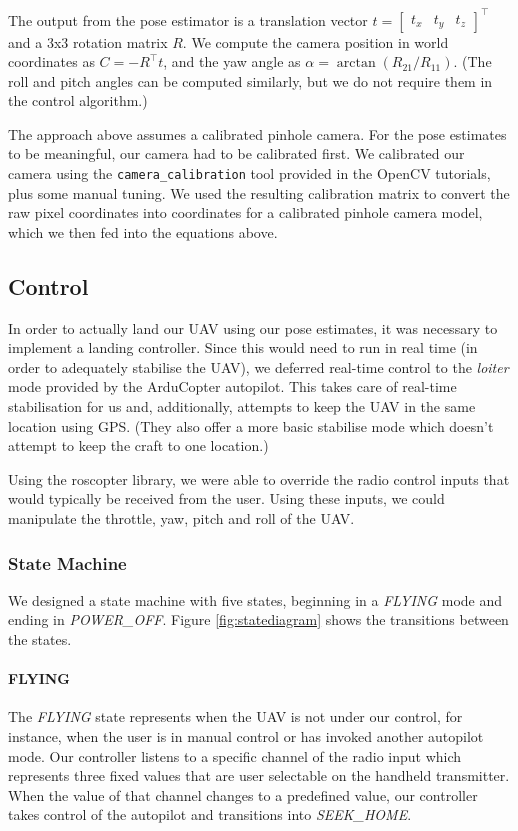 \documentclass[10pt]{scrartcl} %
\begin{document}
The output from the pose estimator is a translation vector
$t = \begin{bmatrix} t_x & t_y & t_z \end{bmatrix}^\top$
and a 3x3 rotation matrix $R$. We compute the camera position in world
coordinates as $C = -R^\top t$, and the yaw angle as
$\alpha = \arctan(R_{21} / R_{11})$. (The roll and pitch angles can be computed
similarly, but we do not require them in the control algorithm.)

The approach above assumes a calibrated pinhole camera. For the pose estimates
to be meaningful, our camera had to be calibrated first. We calibrated our
camera using the {\tt camera\_calibration} tool provided in the OpenCV
tutorials, plus some manual tuning. We used the resulting calibration matrix to
convert the raw pixel coordinates into coordinates for a calibrated pinhole
camera model, which we then fed into the equations above.


\subsection{Control}
In order to actually land our UAV using our pose estimates, it was necessary to implement a landing controller. Since this would need to run in real time (in order to adequately stabilise the UAV), we deferred real-time control to the \textit{loiter} mode provided by the ArduCopter autopilot. This takes care of real-time stabilisation for us and, additionally, attempts to keep the UAV in the same location using GPS. (They also offer a more basic stabilise mode which doesn't attempt to keep the craft to one location.)

Using the roscopter library, we were able to override the radio control inputs that would typically be received from the user. Using these inputs, we could manipulate the throttle, yaw, pitch and roll of the UAV.


\subsubsection{State Machine}
We designed a state machine with five states, beginning in a \textit{FLYING} mode and ending in \textit{POWER\_OFF}. Figure \ref{fig:statediagram} shows the transitions between the states. 

\paragraph{FLYING}
The \textit{FLYING} state represents when the UAV is not under our control, for instance, when the user is in manual control or has invoked another autopilot mode. Our controller listens to a specific channel of the radio input which represents three fixed values that are user selectable on the handheld transmitter. When the value of that channel changes to a predefined value, our controller takes control of the autopilot and transitions into \textit{SEEK\_HOME}.
\end{document}
